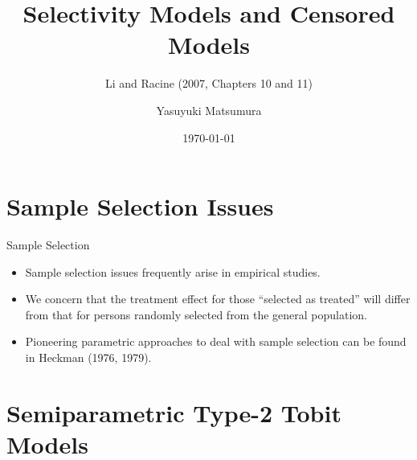 \documentclass[xcolor=svgnames,dvipdfmx,cjk]{beamer}
\theoremstyle{example}
\begin{document}
 

\title{Selectivity Models and Censored Models} 
\subtitle{Li and Racine (2007, Chapters 10 and 11)}
\author{Yasuyuki Matsumura}
\date{\today} %

\begin{frame}                  
\titlepage            
\end{frame}



\section{Sample Selection Issues}

\begin{frame}{Sample Selection}

      \begin{itemize}
            \item Sample selection issues frequently arise in empirical studies.
            \item We concern that the treatment effect for those ``selected as treated'' 
                  will differ from that for persons randomly selected from the general population.
            \item Pioneering parametric approaches to deal with sample selection can be found in Heckman (1976, 1979).
      \end{itemize}
      
\end{frame}


\section{Semiparametric Type-2 Tobit Models}
\end{document}
